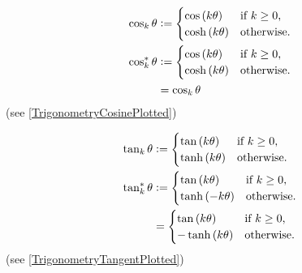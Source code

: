 \documentclass[stu, babel, american, biblatex, a4paper, leqno, draftall]{apa7}
\begin{document}
\begin{example}\label{M:Trigonometry:Cosine}
    \begin{align*}
        \cos_k{\theta} & \vcentcolon=
        \begin{cases}
            \cos\left(k\theta\right)  & \text{if $k\geq0$,} \\
            \cosh\left(k\theta\right) & \text{otherwise.}   \\
        \end{cases} \\
        \cos_k^\ast{\theta} & \vcentcolon=
        \begin{cases}
            \cos\left(k\theta\right)  & \text{if $k\geq0$,} \\
            \cosh\left(k\theta\right) & \text{otherwise.}   \\
        \end{cases} \\
        & = \cos_k{\theta}
    \end{align*}
    (see \cref{TrigonometryCosinePlotted})
\end{example}
\begin{example}\label{M:Trigonometry:Tangent}
    \begin{align*}
        \tan_k{\theta} & \vcentcolon=
        \begin{cases}
            \tan\left(k\theta\right)  & \text{if $k\geq0$,} \\
            \tanh\left(k\theta\right) & \text{otherwise.}   \\
        \end{cases} \\
        \tan_k^\ast{\theta} & \vcentcolon=
        \begin{cases}
            \tan\left(k\theta\right)  & \text{if $k\geq0$,} \\
            \tanh\left(-k\theta\right) & \text{otherwise.}   \\
        \end{cases} \\
        & =
        \begin{cases}
            \tan\left(k\theta\right)  & \text{if $k\geq0$,} \\
            -\tanh\left(k\theta\right) & \text{otherwise.}   \\
        \end{cases}
    \end{align*}
    (see \cref{TrigonometryTangentPlotted})
\end{example}
\end{document}
